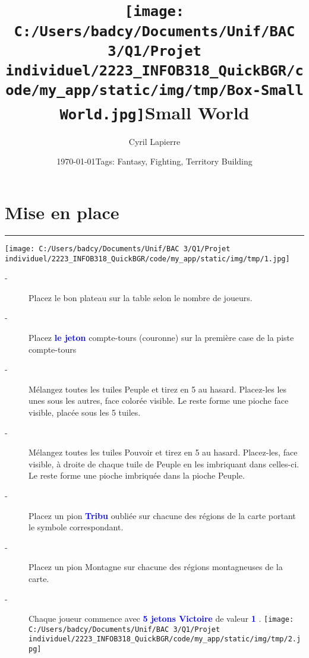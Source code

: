 \documentclass{scrartcl}%
\title{\texttt{[image: C:/Users/badcy/Documents/Unif/BAC 3/Q1/Projet individuel/2223\_INFOB318\_QuickBGR/code/my\_app/static/img/tmp/Box-Small World.jpg]}\break Small World }%
\author{Cyril Lapierre}%
\date{\today \break Tags: Fantasy, Fighting, Territory Building}%
\begin{document}
%
\normalsize%
\maketitle\thispagestyle{header}%
\pagestyle{header}%
\sectionfont{\color{blue}}%
\subsectionfont{\color{blue}}%
\subsubsectionfont{\color{blue}}%
\section{ Mise en place
}%
\label{sec:Miseenplace}%
\textcolor{blue}{\rule{18cm}{0.07cm}}\break%
%
\begin{center}\texttt{[image: C:/Users/badcy/Documents/Unif/BAC 3/Q1/Projet individuel/2223\_INFOB318\_QuickBGR/code/my\_app/static/img/tmp/1.jpg]}\end{center}%

%

%
\begin{description}%
\item[{-} ]%
%
 Placez le bon plateau sur la table selon le nombre de joueurs. 
%
\item[{-} ]%
%
 Placez %
\textcolor{blue}{%
\textbf{le jeton}%
}%
\textit{ }%
 compte{-}tours (couronne) sur la première case de la piste compte{-}tours
%
\item[{-} ]%
%
 Mélangez toutes les tuiles Peuple et tirez en 5 au hasard. Placez{-}les les unes sous les autres, face colorée visible. Le reste forme une pioche face visible, placée sous les 5 tuiles.
%
\item[{-} ]%
%
 Mélangez toutes les tuiles Pouvoir et tirez en 5 au hasard. Placez{-}les, face visible, à droite de chaque tuile de Peuple en les imbriquant dans celles{-}ci. Le reste forme une pioche imbriquée dans la pioche Peuple.
%
\item[{-} ]%
%
 Placez un pion %
\textcolor{blue}{%
\textbf{Tribu}%
}%
\textit{ }%
 oubliée sur chacune des régions de la carte portant le symbole correspondant.
%
\item[{-} ]%
%
 Placez un pion Montagne sur chacune des régions montagneuses de la carte.
%
\item[{-} ]%
%
 Chaque joueur commence avec %
\textcolor{blue}{%
\textbf{5 jetons Victoire}%
}%
\textit{ }%
 de valeur %
\textcolor{blue}{%
\textbf{1}%
}%
.%
\texttt{[image: C:/Users/badcy/Documents/Unif/BAC 3/Q1/Projet individuel/2223\_INFOB318\_QuickBGR/code/my\_app/static/img/tmp/2.jpg]}%

%

%
\end{description}
\end{document}
